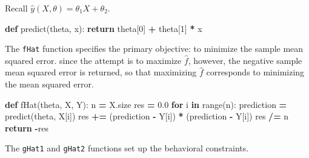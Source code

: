\documentclass[12pt, twoside]{amherstthesis}
\newenvironment{Shaded}{\begin{snugshade}}{\end{snugshade}}
\newcommand{\BuiltInTok}[1]{#1}
\newcommand{\ControlFlowTok}[1]{\textcolor[rgb]{0.13,0.29,0.53}{\textbf{#1}}}
\newcommand{\DecValTok}[1]{\textcolor[rgb]{0.00,0.00,0.81}{#1}}
\newcommand{\FloatTok}[1]{\textcolor[rgb]{0.00,0.00,0.81}{#1}}
\newcommand{\KeywordTok}[1]{\textcolor[rgb]{0.13,0.29,0.53}{\textbf{#1}}}
\newcommand{\NormalTok}[1]{#1}
\newcommand{\OperatorTok}[1]{\textcolor[rgb]{0.81,0.36,0.00}{\textbf{#1}}}
\begin{document}
\noindent Recall \(\hat{y}(X, \theta) = \theta_1 X + \theta_2\).
\begin{Shaded}
\begin{Highlighting}[]
\KeywordTok{def}\NormalTok{ predict(theta, x):}
    \ControlFlowTok{return}\NormalTok{ theta[}\DecValTok{0}\NormalTok{] }\OperatorTok{+}\NormalTok{ theta[}\DecValTok{1}\NormalTok{] }\OperatorTok{*}\NormalTok{ x}
\end{Highlighting}
\end{Shaded}
\noindent The \texttt{fHat} function specifies the primary objective: to minimize the sample mean squared error. since the attempt is to maximize \(\hat{f}\), however, the negative sample mean squared error is returned, so that maximizing \(\hat{f}\) corresponds to minimizing the mean squared error.
\begin{Shaded}
\begin{Highlighting}[]
\KeywordTok{def}\NormalTok{ fHat(theta, X, Y):}
\NormalTok{    n }\OperatorTok{=}\NormalTok{ X.size          }
\NormalTok{    res }\OperatorTok{=} \FloatTok{0.0}           
    \ControlFlowTok{for}\NormalTok{ i }\KeywordTok{in} \BuiltInTok{range}\NormalTok{(n):  }
\NormalTok{        prediction }\OperatorTok{=}\NormalTok{ predict(theta, X[i])                }
\NormalTok{        res }\OperatorTok{+=}\NormalTok{ (prediction }\OperatorTok{{-}}\NormalTok{ Y[i]) }\OperatorTok{*}\NormalTok{ (prediction }\OperatorTok{{-}}\NormalTok{ Y[i]) }
\NormalTok{    res }\OperatorTok{/=}\NormalTok{ n            }
    \ControlFlowTok{return} \OperatorTok{{-}}\NormalTok{res         }
\end{Highlighting}
\end{Shaded}
\noindent The \texttt{gHat1} and \texttt{gHat2} functions set up the behavioral constraints.
\end{document}
